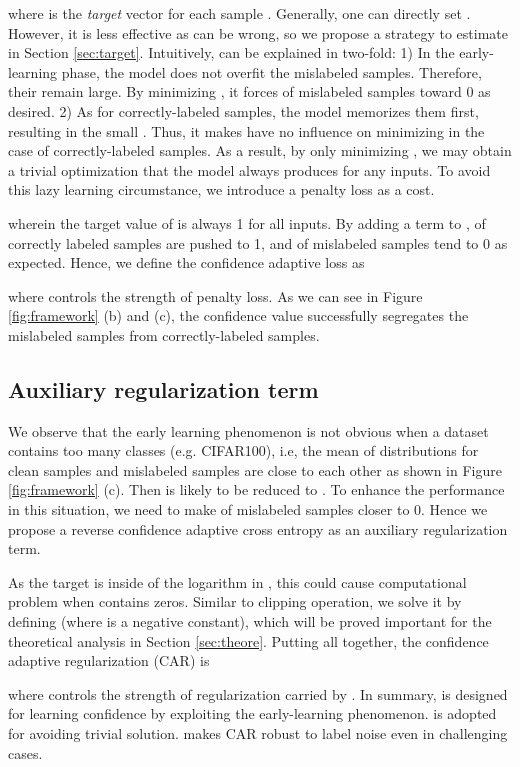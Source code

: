 \documentclass{article}
\begin{document}
where  is the \emph{target} vector for each sample . Generally, one can directly set . However, it is less effective as  can be wrong, so we propose a strategy to estimate  in Section \ref{sec:target}.
Intuitively,  can be explained in two-fold: 1) In the early-learning phase, the model does not overfit the mislabeled samples. Therefore, their  remain large. By minimizing , it forces  of mislabeled samples toward 0 as desired. 2) As for correctly-labeled samples, the model memorizes them first, resulting in the small . Thus, it makes  have no influence on minimizing  in the case of correctly-labeled samples. As a result, by only minimizing , we may obtain a trivial optimization that the model always produces  for any inputs. To avoid this lazy learning circumstance, we introduce a penalty loss  as a cost.

wherein the target value of  is always 1 for all inputs. By adding a term  to ,  of correctly labeled samples are pushed to 1, and  of mislabeled samples tend to 0 as expected. Hence, we define the confidence adaptive loss as

where  controls the strength of penalty loss. As we can see in Figure \ref{fig:framework} (b) and (c), the confidence value  successfully segregates the mislabeled samples from correctly-labeled samples.




\subsection{Auxiliary regularization term}
\label{sec:car}
We observe that the early learning phenomenon is not obvious when a dataset contains too many classes (e.g. CIFAR100), i.e, the mean of  distributions for clean samples and mislabeled samples are close to each other as shown in Figure \ref{fig:framework} (c). Then  is likely to be reduced to . To enhance the performance in this situation, we need to make  of mislabeled samples closer to 0. Hence we propose a reverse confidence adaptive cross entropy as an auxiliary regularization term.

As the target  is inside of the logarithm in , this could cause computational problem when  contains zeros. Similar to clipping operation, we solve it by defining  (where  is a negative constant), which will be proved important for the theoretical analysis in Section \ref{sec:theore}. Putting all together, the confidence adaptive regularization (CAR) is

where  controls the strength of regularization carried by . In summary,  is designed for learning confidence by exploiting the early-learning phenomenon.  is adopted for avoiding trivial solution.  makes CAR robust to label noise even in challenging cases. 
\end{document}
